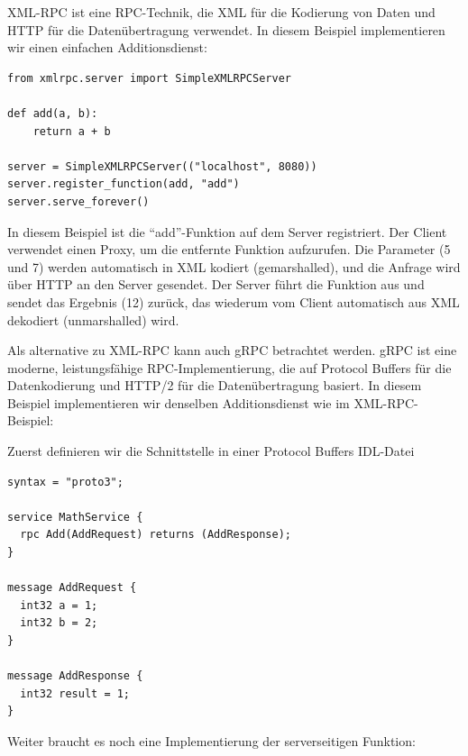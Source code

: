 XML-RPC ist eine RPC-Technik, die XML für die Kodierung von Daten und HTTP für die Datenübertragung verwendet. In diesem Beispiel implementieren wir einen einfachen Additionsdienst:

\noindent\begin{minipage}{\textwidth}
\begin{lstlisting}[caption={XML-RPC in Python},captionpos=b,label={lst:xmp-rpc-python}]
from xmlrpc.server import SimpleXMLRPCServer

def add(a, b):
    return a + b

server = SimpleXMLRPCServer(("localhost", 8080))
server.register_function(add, "add")
server.serve_forever()
\end{lstlisting}
\end{minipage}

In diesem Beispiel ist die \enquote{add}-Funktion auf dem Server registriert. Der Client verwendet einen Proxy, um die entfernte Funktion aufzurufen. Die Parameter (5 und 7) werden automatisch in XML kodiert (gemarshalled), und die Anfrage wird über HTTP an den Server gesendet. Der Server führt die Funktion aus und sendet das Ergebnis (12) zurück, das wiederum vom Client automatisch aus XML dekodiert (unmarshalled) wird.

Als alternative zu XML-RPC kann auch gRPC betrachtet werden. gRPC ist eine moderne, leistungsfähige RPC-Implementierung, die auf Protocol Buffers für die Datenkodierung und HTTP/2 für die Datenübertragung basiert. In diesem Beispiel implementieren wir denselben Additionsdienst wie im XML-RPC-Beispiel:

Zuerst definieren wir die Schnittstelle in einer Protocol Buffers IDL-Datei 

\noindent\begin{minipage}{\textwidth}
\begin{lstlisting}[caption={gRPC IDL},captionpos=b,label={lst:grpc-idl}]
syntax = "proto3";

service MathService {
  rpc Add(AddRequest) returns (AddResponse);
}

message AddRequest {
  int32 a = 1;
  int32 b = 2;
}

message AddResponse {
  int32 result = 1;
}
\end{lstlisting}
\end{minipage}

Weiter braucht es noch eine Implementierung der serverseitigen Funktion:

